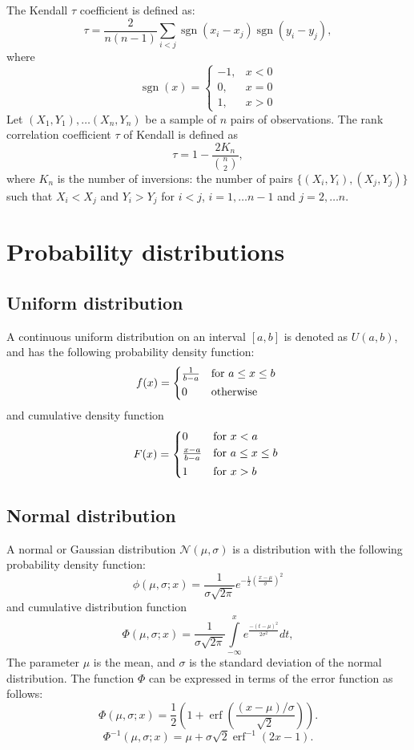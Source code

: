 \documentclass{article}
\newcommand{\func}[1]{\ensuremath{\textsf{#1}}} %
\newcommand{\set}[1]{\ensuremath{\{ #1 \} }} %
\DeclareMathOperator\erf{erf}
\begin{document}
\vspace{0.5cm}
\noindent
The Kendall $\tau$ coefficient is defined as: 
\[
  \tau ={\frac {2}{n(n-1)}}\sum _{i<j}\operatorname {sgn}(x_{i}-x_{j})\operatorname {sgn}(y_{i}-y_{j}),
\]
where
\[
\operatorname{sgn}(x) = 
\begin{cases*}
-1, & x < 0 \\
0, & x = 0 \\
1, & x > 0
\end{cases*}
\]
Let $(X_1, Y_1), \ldots (X_n, Y_n)$ be a sample of $n$ pairs of observations. The rank correlation coefficient $\tau$ of Kendall is defined as
\[
\tau = 1 - \frac{2 K_n}{{n \choose 2}},
\]
where $K_n$ is the number of inversions: the number of pairs
$\set{(X_i, Y_i), (X_j, Y_j)}$ such that $X_i < X_j$ and $Y_i > Y_j$
for $i < j$, $i = 1, \ldots n-1$ and $j = 2, \ldots n$.

\section{Probability distributions}

\subsection{Uniform distribution}
A continuous uniform distribution on an interval $[a,b]$ is denoted as $U(a,b)$, and has the following probability density function:
\[
f(x) = 
\begin{cases*}
1 \over b-a & for $a \leq x \leq b$ \\
0 & otherwise
\end{cases*}
\]
and cumulative density function
\[
F(x) = 
\begin{cases*}
0 & for $x < a$ \\
x-a \over b-a & for $a \leq x \leq b$ \\
1 & for $x > b$
\end{cases*}
\]

\subsection{Normal distribution}
A normal or Gaussian distribution $\mathcal{N}(\mu,\sigma)$ is a distribution with the following probability density function:
\[
\phi(\mu,\sigma;x) = \frac{1}{\sigma \sqrt{2 \pi}} e^{- \frac{1}{2} \left( \frac{x-\mu}{\sigma}\right)^2}
\]
and cumulative distribution function
\[
\Phi(\mu,\sigma;x) = \frac{1}{\sigma \sqrt{2 \pi}} 
\int\limits_{-\infty}^x e^{\frac{-(t-\mu)^2}{2 \sigma^2}} dt,
\]
The parameter $\mu$ is the mean, and $\sigma$ is the standard deviation of the normal distribution. The function $\Phi$ can be expressed in terms of the error function as follows:
\[
\Phi(\mu,\sigma;x) = \frac{1}{2}(1 + \erf(\frac{(x - \mu)/\sigma}{\sqrt{2}})).
\]
\[
\Phi^{-1}(\mu,\sigma;x) = \mu + \sigma \sqrt{2} \erf^{-1}(2x-1).
\]
\end{document}
